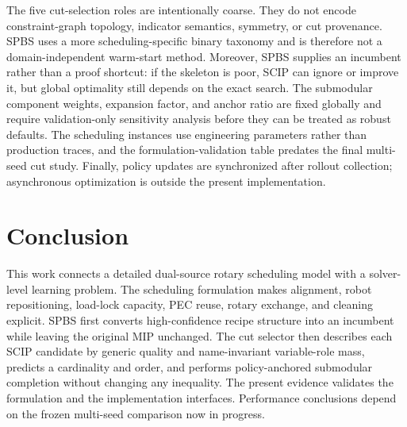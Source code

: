 \documentclass[letterpaper]{article}
\begin{document}
The five cut-selection roles are intentionally coarse.
They do not encode constraint-graph topology, indicator semantics, symmetry, or cut provenance.
SPBS uses a more scheduling-specific binary taxonomy and is therefore not a domain-independent warm-start method.
Moreover, SPBS supplies an incumbent rather than a proof shortcut: if the skeleton is poor, SCIP can ignore or improve it, but global optimality still depends on the exact search.
The submodular component weights, expansion factor, and anchor ratio are fixed globally and require validation-only sensitivity analysis before they can be treated as robust defaults.
The scheduling instances use engineering parameters rather than production traces, and the formulation-validation table predates the final multi-seed cut study.
Finally, policy updates are synchronized after rollout collection; asynchronous optimization is outside the present implementation.

\section{Conclusion}

This work connects a detailed dual-source rotary scheduling model with a solver-level learning problem.
The scheduling formulation makes alignment, robot repositioning, load-lock capacity, PEC reuse, rotary exchange, and cleaning explicit.
SPBS first converts high-confidence recipe structure into an incumbent while leaving the original MIP unchanged.
The cut selector then describes each SCIP candidate by generic quality and name-invariant variable-role mass, predicts a cardinality and order, and performs policy-anchored submodular completion without changing any inequality.
The present evidence validates the formulation and the implementation interfaces.
Performance conclusions depend on the frozen multi-seed comparison now in progress.


\end{document}

